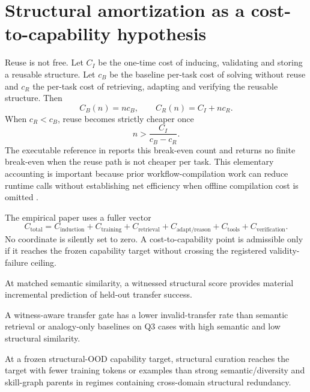 \section{Structural amortization as a cost-to-capability hypothesis}

Reuse is not free. Let $C_I$ be the one-time cost of inducing, validating and storing a reusable structure. Let $c_B$ be the baseline per-task cost of solving without reuse and $c_R$ the per-task cost of retrieving, adapting and verifying the reusable structure. Then
\[
C_B(n)=n c_B,
\qquad
C_R(n)=C_I+n c_R.
\]
When $c_R<c_B$, reuse becomes strictly cheaper once
\[
n>\frac{C_I}{c_B-c_R}.
\]
The executable reference in  reports this break-even count and returns no finite break-even when the reuse path is not cheaper per task. This elementary accounting is important because prior workflow-compilation work can reduce runtime calls without establishing net efficiency when offline compilation cost is omitted \cite{elyadouni2026tracecompiler}.

The empirical paper uses a fuller vector
\[
C_{\mathrm{total}}=
C_{\mathrm{induction}}+
C_{\mathrm{training}}+
C_{\mathrm{retrieval}}+
C_{\mathrm{adapt/reason}}+
C_{\mathrm{tools}}+
C_{\mathrm{verification}}.
\]
No coordinate is silently set to zero. A cost-to-capability point is admissible only if it reaches the frozen capability target without crossing the registered validity-failure ceiling.

\begin{hypothesis}
At matched semantic similarity, a witnessed structural score provides material incremental prediction of held-out transfer success.
\end{hypothesis}

\begin{hypothesis}
A witness-aware transfer gate has a lower invalid-transfer rate than semantic retrieval or analogy-only baselines on Q3 cases with high semantic and low structural similarity.
\end{hypothesis}

\begin{hypothesis}
At a frozen structural-OOD capability target, structural curation reaches the target with fewer training tokens or examples than strong semantic/diversity and skill-graph parents in regimes containing cross-domain structural redundancy.
\end{hypothesis}

